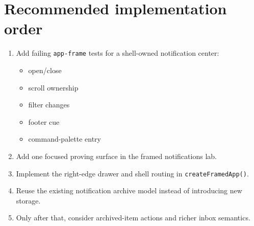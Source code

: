 \section{Recommended implementation order}\label{record-053-recommended-implementation-order}

\begin{enumerate}
\def\labelenumi{\arabic{enumi}.}
\tightlist
\item
  Add failing \texttt{a\allowbreak{}p\allowbreak{}p\allowbreak{}-\allowbreak{}f\allowbreak{}r\allowbreak{}a\allowbreak{}m\allowbreak{}e} tests for a shell-owned notification center:

  \begin{itemize}
  \tightlist
  \item
    open/close
  \item
    scroll ownership
  \item
    filter changes
  \item
    footer cue
  \item
    command-palette entry
  \end{itemize}
\item
  Add one focused proving surface in the framed notifications lab.
\item
  Implement the right-edge drawer and shell routing in \texttt{c\allowbreak{}r\allowbreak{}e\allowbreak{}a\allowbreak{}t\allowbreak{}e\allowbreak{}F\allowbreak{}r\allowbreak{}a\allowbreak{}m\allowbreak{}e\allowbreak{}d\allowbreak{}A\allowbreak{}p\allowbreak{}p\allowbreak{}(\allowbreak{})}.
\item
  Reuse the existing notification archive model instead of introducing new storage.
\item
  Only after that, consider archived-item actions and richer inbox semantics.
\end{enumerate}

